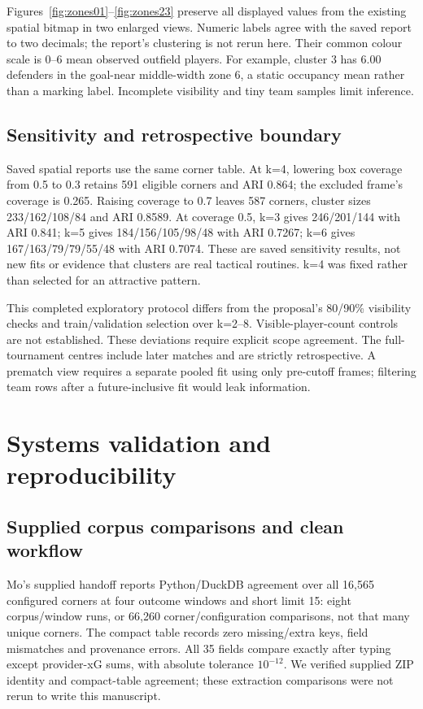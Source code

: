 \documentclass[sigconf,nonacm]{acmart}
\begin{document}
Figures~\ref{fig:zones01}--\ref{fig:zones23} preserve all displayed values from the
existing spatial bitmap in two enlarged views. Numeric labels agree with the saved
report to two decimals; the report's clustering is not rerun here. Their common
colour scale is 0--6 mean observed outfield players. For example, cluster 3 has
6.00 defenders in the goal-near middle-width zone 6, a static occupancy mean rather
than a marking label. Incomplete visibility and tiny team samples limit inference.


\subsection{Sensitivity and retrospective boundary}
Saved spatial reports use the same corner table. At k=4, lowering box coverage
from 0.5 to 0.3 retains 591 eligible corners and ARI 0.864; the excluded frame's
coverage is 0.265. Raising coverage to 0.7 leaves 587 corners, cluster sizes
233/\allowbreak{}162/\allowbreak{}108/\allowbreak{}84 and ARI 0.8589. At coverage 0.5, k=3 gives 246/\allowbreak{}201/\allowbreak{}144 with ARI 0.841;
k=5 gives 184/\allowbreak{}156/\allowbreak{}105/\allowbreak{}98/\allowbreak{}48 with ARI 0.7267; k=6 gives 167/\allowbreak{}163/\allowbreak{}79/\allowbreak{}79/\allowbreak{}55/\allowbreak{}48 with
ARI 0.7074. These are saved sensitivity results, not new fits or evidence that
clusters are real tactical routines. k=4 was fixed rather than selected for an
attractive pattern.

This completed exploratory protocol differs from the proposal's 80/\allowbreak{}90\% visibility
checks and train/validation selection over k=2--8. Visible-player-count controls
are not established. These deviations require explicit scope agreement. The
full-tournament centres include later matches and are strictly retrospective.
A prematch view requires a separate pooled fit using only pre-cutoff frames;
filtering team rows after a future-inclusive fit would leak information.

\section{Systems validation and reproducibility}
\subsection{Supplied corpus comparisons and clean workflow}
Mo's supplied handoff reports Python/DuckDB agreement over all 16,565 configured
corners at four outcome windows and short limit 15: eight corpus/window runs, or
66,260 corner/configuration comparisons, not that many unique corners. The compact
table records zero missing/extra keys, field mismatches and provenance errors.
All 35 fields compare exactly after typing except provider-xG sums, with absolute
tolerance $10^{-12}$. We verified supplied ZIP identity and compact-table agreement;
these extraction comparisons were not rerun to write this manuscript.
\end{document}
